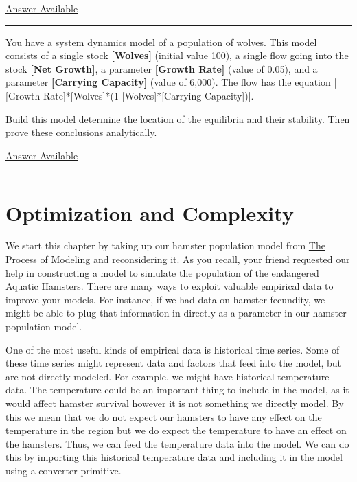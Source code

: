 \documentclass[]{memoir}
\newcommand{\DecValTok}[1]{\textcolor[rgb]{0.25,0.63,0.44}{{#1}}}
\newcommand{\NormalTok}[1]{{#1}}
\newcommand{\p}[1]{\textbf{{[}#1{]}}}
\begin{document}
\hyperref[Ans-11-20]{Answer Available}

\begin{center}\rule{3in}{0.4pt}\end{center}


You have a system dynamics model of a population of wolves. This model
consists of a single stock \p{Wolves} (initial value 100), a single flow
going into the stock \p{Net Growth}, a parameter \p{Growth Rate} (value
of 0.05), and a parameter \p{Carrying Capacity} (value of 6,000). The
flow has the equation
|\NormalTok{[Growth Rate]*[Wolves]*(}\DecValTok{1}\NormalTok{-[Wolves]*[Carrying Capacity])}|.

Build this model determine the location of the equilibria and their
stability. Then prove these conclusions analytically.

\hyperref[Ans-11-21]{Answer Available}

\begin{center}\rule{3in}{0.4pt}\end{center}

\chapter{Optimization and Complexity}

We start this chapter by taking up our hamster population model from
\hyperref[ModelingProcess]{The Process of Modeling} and reconsidering
it. As you recall, your friend requested our help in constructing a
model to simulate the population of the endangered Aquatic Hamsters.
There are many ways to exploit valuable empirical data to improve your
models. For instance, if we had data on hamster fecundity, we might be
able to plug that information in directly as a parameter in our hamster
population model.

One of the most useful kinds of empirical data is historical time
series. Some of these time series might represent data and factors that
feed into the model, but are not directly modeled. For example, we might
have historical temperature data. The temperature could be an important
thing to include in the model, as it would affect hamster survival
however it is not something we directly model. By this we mean that we
do not expect our hamsters to have any effect on the temperature in the
region but we do expect the temperature to have an effect on the
hamsters. Thus, we can feed the temperature data into the model. We can
do this by importing this historical temperature data and including it
in the model using a converter primitive.
\end{document}

